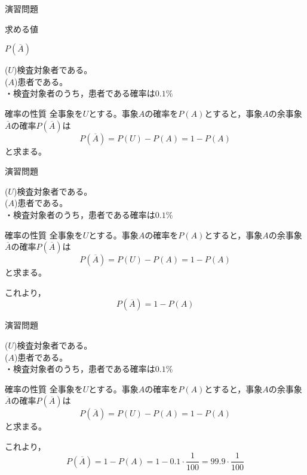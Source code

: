 \documentclass[aspectratio=169, dvipdfmx, 11pt]{beamer}
\begin{document}
\begin{frame}{演習問題}

\begin{alertblock}{求める値}
\begin{center}
$P(\overline{A})$
\end{center}
\end{alertblock}

($U$)検査対象者である。\\
($A$)患者である。\\

・検査対象者のうち，患者である確率は$0.1\%$\\

\begin{block}{確率の性質}
全事象を$U$とする。事象$A$の確率を$P(A)$とすると，事象$A$の余事象$\overline{A}$の確率$P(\overline{A})$は
\begin{equation}
P(\overline{A})=P(U)-P(A)=1-P(A)
\end{equation}
と求まる。
\end{block}

\end{frame}


\begin{frame}{演習問題}

($U$)検査対象者である。\\
($A$)患者である。\\

・検査対象者のうち，患者である確率は$0.1\%$\\

\begin{block}{確率の性質}
全事象を$U$とする。事象$A$の確率を$P(A)$とすると，事象$A$の余事象$\overline{A}$の確率$P(\overline{A})$は
\begin{equation}
P(\overline{A})=P(U)-P(A)=1-P(A)
\end{equation}
と求まる。
\end{block}
これより，
\begin{equation}
P(\overline{A})=1-P(A)
\end{equation}

\end{frame}


\begin{frame}{演習問題}

($U$)検査対象者である。\\
($A$)患者である。\\

・検査対象者のうち，患者である確率は$0.1\%$\\

\begin{block}{確率の性質}
全事象を$U$とする。事象$A$の確率を$P(A)$とすると，事象$A$の余事象$\overline{A}$の確率$P(\overline{A})$は
\begin{equation}
P(\overline{A})=P(U)-P(A)=1-P(A)
\end{equation}
と求まる。
\end{block}
これより，
\begin{equation}
P(\overline{A})=1-P(A)=1-0.1\cdot \frac{1}{100}=99.9\cdot \frac{1}{100}
\end{equation}

\end{frame}
\end{document}
